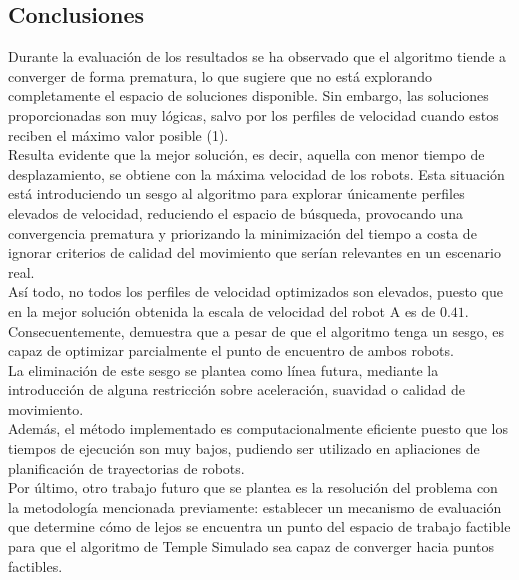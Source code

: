 \subsection*{Conclusiones}
Durante la evaluación de los resultados se ha observado que el algoritmo tiende a converger de forma
prematura, lo que sugiere que no está explorando completamente el espacio de soluciones
disponible. Sin embargo, las soluciones proporcionadas son muy lógicas, salvo por los perfiles 
de velocidad cuando estos reciben el máximo valor posible (1). \\

Resulta evidente que la mejor solución, es decir, aquella con menor tiempo de desplazamiento,
se obtiene con la máxima velocidad de los robots. Esta situación está introduciendo un sesgo al 
algoritmo para explorar únicamente perfiles elevados de velocidad, reduciendo el espacio de búsqueda, provocando una convergencia prematura y priorizando la minimización del tiempo a costa de ignorar
criterios de calidad del movimiento que serían relevantes en un escenario real. \\

Así todo, no todos los perfiles de velocidad optimizados son elevados, puesto que 
en la mejor solución obtenida la escala de velocidad del robot A es de $0.41$. 
Consecuentemente, demuestra que a pesar de que el algoritmo tenga un sesgo, es capaz 
de optimizar parcialmente el punto de encuentro de ambos robots. \\

La eliminación de este sesgo se plantea como línea futura, mediante la introducción
de alguna restricción sobre aceleración, suavidad o calidad de movimiento. \\

Además, el método implementado es computacionalmente eficiente puesto que 
los tiempos de ejecución son muy bajos, pudiendo ser utilizado en apliaciones de planificación 
de trayectorias de robots. \\

Por último, otro trabajo futuro que se plantea es la resolución del problema con la metodología
mencionada previamente: establecer un mecanismo de evaluación que determine cómo de lejos se 
encuentra un punto del espacio de trabajo factible para que el algoritmo de 
Temple Simulado sea capaz de converger hacia puntos factibles.

